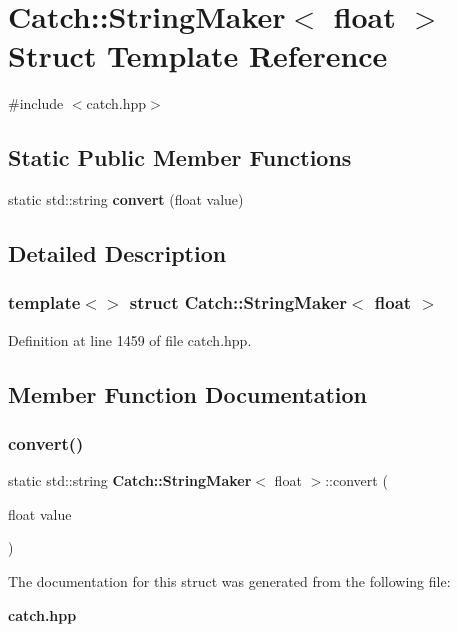 \section{Catch\+::String\+Maker$<$ float $>$ Struct Template Reference}
\label{struct_catch_1_1_string_maker_3_01float_01_4}


{\ttfamily \#include $<$catch.\+hpp$>$}

\subsection*{Static Public Member Functions}
\begin{DoxyCompactItemize}
\item 
static std\+::string \textbf{ convert} (float value)
\end{DoxyCompactItemize}


\subsection{Detailed Description}
\subsubsection*{template$<$$>$\newline
struct Catch\+::\+String\+Maker$<$ float $>$}



Definition at line 1459 of file catch.\+hpp.



\subsection{Member Function Documentation}
\mbox{\label{struct_catch_1_1_string_maker_3_01float_01_4_a7ffacc6fa46a338200f3fbb2ee078648}} 
\subsubsection{convert()}
{\footnotesize\ttfamily static std\+::string \textbf{ Catch\+::\+String\+Maker}$<$ float $>$\+::convert (\begin{DoxyParamCaption}\item[{float}]{value }\end{DoxyParamCaption})\hspace{0.3cm}{\ttfamily [static]}}



The documentation for this struct was generated from the following file\+:\begin{DoxyCompactItemize}
\item 
\textbf{ catch.\+hpp}\end{DoxyCompactItemize}
